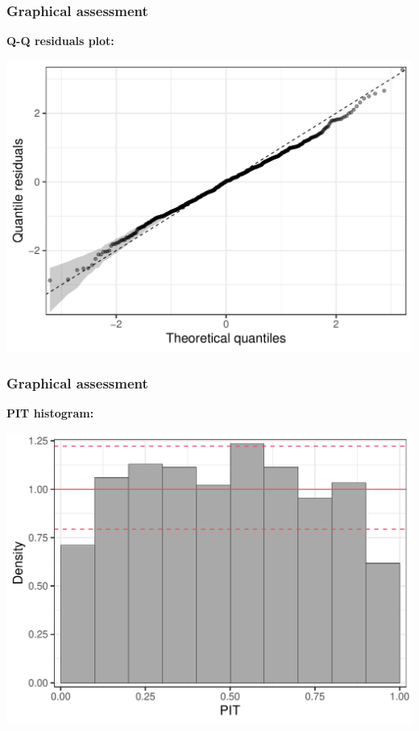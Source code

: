 \documentclass[11pt,t,usepdftitle=false,aspectratio=169]{beamer}
\begin{document}
\begin{frame}[fragile]
\frametitle{Graphical assessment}

\vspace{-0.75em}

\textbf{Q-Q residuals plot:}  

\vspace{0.25em}

\begin{center}
\includegraphics{slides-rain_topmodels_df_qqrplot}
\end{center}
\end{frame}


\begin{frame}[fragile]
\frametitle{Graphical assessment}

\vspace{-0.75em}

\textbf{PIT histogram:}  

\vspace{0.25em}

\begin{center}
\includegraphics{slides-rain_topmodels_df_pithist}
\end{center}
\end{frame}
\end{document}
